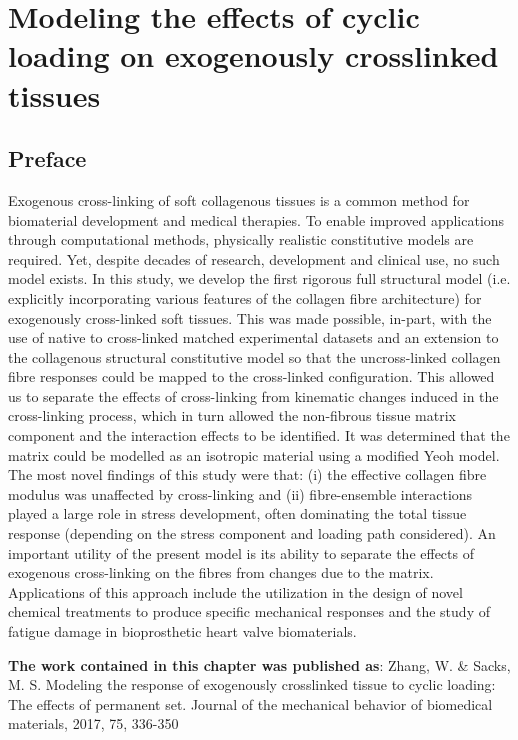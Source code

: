 \chapter{Modeling the effects of cyclic loading on exogenously crosslinked tissues}

\section*{Preface}
%

    Exogenous cross-linking of soft collagenous tissues is a common method for biomaterial development and medical therapies. To enable improved applications through computational methods, physically realistic constitutive models are required. Yet, despite decades of research, development and clinical use, no such model exists. In this study, we develop the first rigorous full structural model (i.e. explicitly incorporating various features of the collagen fibre architecture) for exogenously cross-linked soft tissues. This was made possible, in-part, with the use of native to cross-linked matched experimental datasets and an extension to the collagenous structural constitutive model so that the uncross-linked collagen fibre responses could be mapped to the cross-linked configuration. This allowed us to separate the effects of cross-linking from kinematic changes induced in the cross-linking process, which in turn allowed the non-fibrous tissue matrix component and the interaction effects to be identified. It was determined that the matrix could be modelled as an isotropic material using a modified Yeoh model. The most novel findings of this study were that: (i) the effective collagen fibre modulus was unaffected by cross-linking and (ii) fibre-ensemble interactions played a large role in stress development, often dominating the total tissue response (depending on the stress component and loading path considered). An important utility of the present model is its ability to separate the effects of exogenous cross-linking on the fibres from changes due to the matrix. Applications of this approach include the utilization in the design of novel chemical treatments to produce specific mechanical responses and the study of fatigue damage in bioprosthetic heart valve biomaterials.
    
\textbf{The work contained in this chapter was published as}: Zhang, W. \& Sacks, M. S.
Modeling the response of exogenously crosslinked tissue to cyclic loading: The effects of permanent set. 
Journal of the mechanical behavior of biomedical materials, 2017, 75, 336-350 





